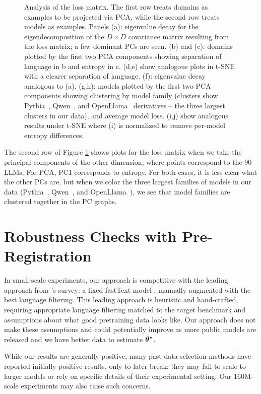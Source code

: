 \documentclass{article} %
\begin{document}
\begin{figure}[t]
\caption{Analysis of the loss matrix. The first row treats domains as examples to be projected via PCA, while the second row treats models as examples.
Panels (a): eigenvalue decay for the eigendecomposition of the $D{\times}D$ covariance matrix resulting from the loss matrix; a few dominant PCs are seen. (b) and (c): domains plotted by the first two PCA components showing separation of language in b and entropy in c. (d,e) show analogous plots in t-SNE with a clearer separation of language. (f): eigenvalue decay analogous to (a). (g,h): models plotted by the first two PCA components showing clustering by model family (clusters show Pythia~\citep{pythia}, Qwen~\citep{qwen}, and OpenLlama~\citep{openllama} derivatives -- the three largest clusters in our data), and average model loss. (i,j) show analogous results under t-SNE where (i) is normalized to remove per-model entropy differences.}
\label{analysis_figure}
\end{figure}

The second row of Figure \ref{analysis_figure} shows plots for the loss matrix when we take the principal components of the other dimension, where points correspond to the 90 LLMs. For PCA, PC1 corresponds to entropy. For both cases, it is less clear what the other PCs are, but when we color the three largest families of models in our data (Pythia~\citep{pythia}, Qwen~\citep{qwen}, and OpenLlama~\citep{openllama}), we see that model families are clustered together in the PC graphs.

\section{Robustness Checks with Pre-Registration}
\label{sec:preregistration}
In small-scale experiments, our approach is competitive with the leading approach from \citeauthor{datacomp}'s survey: a fixed fastText model \citep{fasttext}, manually augmented with the best language filtering. This leading approach is heuristic and hand-crafted, requiring appropriate language filtering matched to the target benchmark and assumptions about what good pretraining data looks like. Our approach does not make these assumptions and could potentially improve as more public models are released and we have better data to estimate $\bm{{\bf{\theta}^*}}$.

While our results are generally positive, many past data selection methods have reported initially positive results, only to later break: they may fail to scale to larger models or rely on specific details of their experimental setting. Our 160M-scale experiments may also raise such concerns.
\end{document}
